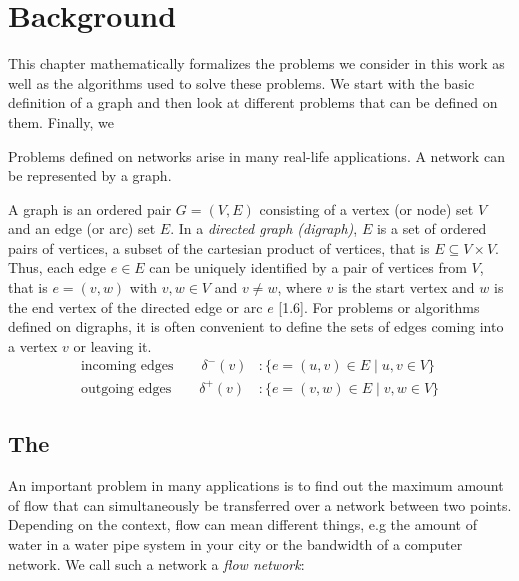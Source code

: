 \chapter{Background}\label{ch:3}
This chapter mathematically formalizes the problems we consider in this work as well as the algorithms used to solve these problems. We start with the basic definition of a graph and then look at different problems that can be defined on them. Finally, we  

Problems defined on networks arise in many real-life applications. A network can be represented by a graph.

\newcommand{\Ein}[1]{\delta^-(#1)}
\newcommand{\Eout}[1]{\delta^+(#1)}
\newcommand{\ein}{{e_{\text{in}}}}
\newcommand{\eout}{{e_{\text{out}}}}

\newcommand{\setfont}[1]{#1}

\begin{definition}
A graph is an ordered pair $G = (V, E)$ consisting of a vertex (or node) set $V$ and an edge (or arc) set $E$. In a \textit{directed graph (digraph)}, $E$ is a set of ordered pairs of vertices, a subset of the cartesian product of vertices, that is $E \subseteq V \times V$. Thus, each edge $e \in E$ can be uniquely identified by a pair of vertices from $V$, that is $e=(v,w)$ with $v,w \in V$ and $v \neq w$, where $v$ is the start vertex and $w$ is the end vertex of the directed edge or arc $e$ \cite{jungnickel2013graphs}[1.6]. For problems or algorithms defined on digraphs, it is often convenient to define the sets of edges coming into a vertex $v$ or leaving it.
\begin{align}
\text{incoming edges} \quad \quad \Ein{v}  &: \{ e=(u,v) \in E \; | \; u,v \in V \}  \\
\text{outgoing edges} \quad \quad \Eout{v} &: \{ e=(v,w) \in E \; | \; v,w \in V \}
\end{align}
\end{definition}


\section{The \maxflow{}}
An important problem in many applications is to find out the maximum amount of flow that can simultaneously be transferred over a network between two points. %
Depending on the context, flow can mean different things, e.g the amount of water in a water pipe system in your city or the bandwidth of a computer network. We call such a network a \textit{flow network}:

